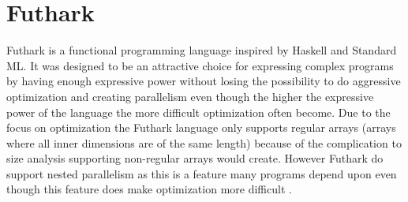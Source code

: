\documentclass[11pt]{article}
\begin{document}




 


\section{Futhark}

Futhark is a functional programming language inspired by Haskell and Standard ML.
It was designed to be an attractive choice for expressing complex programs by having enough expressive power without
losing the possibility to do aggressive optimization and creating parallelism even though the higher the expressive power of the
language the more difficult optimization often become.
Due to the focus on optimization the Futhark language only supports regular arrays
(arrays where all inner dimensions are of the same length)
because of the complication to size analysis supporting non-regular arrays would create.
However Futhark do support nested parallelism as this is a feature many programs 
depend upon even though this feature does make optimization more difficult \cite{TroelsHenriksen}.

\end{document}
